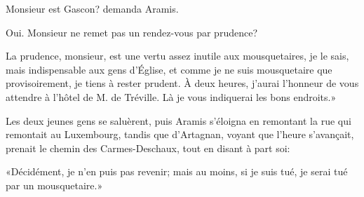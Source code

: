 \speak  Monsieur est Gascon? demanda Aramis. 

\speak  Oui. Monsieur ne remet pas un rendez-vous par prudence? 

\speak  La prudence, monsieur, est une vertu assez inutile aux mousquetaires, je le sais, mais indispensable aux gens d'Église, et comme je ne suis mousquetaire que provisoirement, je tiens à rester prudent. À deux heures, j'aurai l'honneur de vous attendre à l'hôtel de M. de Tréville. Là je vous indiquerai les bons endroits.» 

Les deux jeunes gens se saluèrent, puis Aramis s'éloigna en remontant la rue qui remontait au Luxembourg, tandis que d'Artagnan, voyant que l'heure s'avançait, prenait le chemin des Carmes-Deschaux, tout en disant à part soi: 

«Décidément, je n'en puis pas revenir; mais au moins, si je suis tué, je serai tué par un mousquetaire.»
